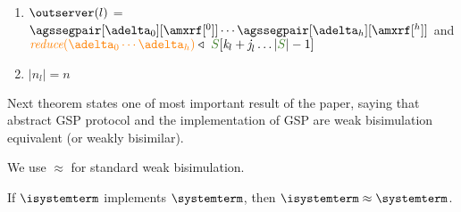 \begin{definition}
\begin{enumerate}
\item \label{prop_outserver2} $\outserver(l)$ = $\agssegpair[\adelta_0][{\amxrf[^{0}]}]\cdots\agssegpair[\adelta_h][{\amxrf[^{h}]}]$ and $\ireduce{\adelta_0\cdots\adelta_h}\triangleleft \ \queuemessage[\tknown_l + \treceivebuffer_l \ldots  |\queuemessage| - 1]$

\item \label{prop_size_buffersent} $|n_l| = n$ 
	

\end{enumerate}
 
	
	
\end{definition}

Next theorem states one of most important result of the paper, saying that abstract GSP protocol and the implementation of GSP are weak bisimulation equivalent (or weakly bisimilar).

We use $\approx$ for standard weak bisimulation.

\begin{theorem} If  $\isystemterm$ implements $\systemterm$, then $\isystemterm\approx\systemterm$. 
\end{theorem}



